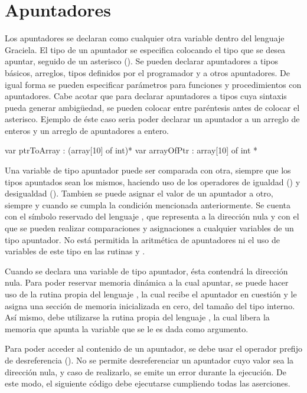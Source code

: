 \section{Apuntadores}

Los apuntadores se declaran como cualquier otra variable dentro del lenguaje
Graciela. El tipo de un apuntador se especifica colocando el tipo que se desea
apuntar, seguido de un asterisco (\ingra{*}). Se pueden declarar apuntadores
a tipos básicos, arreglos, tipos definidos por el programador y a otros
apuntadores. De igual forma se pueden especificar parámetros para funciones y
procedimientos con apuntadores. Cabe acotar que para declarar apuntadores a
tipos cuya sintaxis pueda generar ambigüedad, se pueden colocar entre paréntesis
antes de colocar el asterisco. Ejemplo de éste caso seria poder declarar un apuntador a
un arreglo de enteros y un arreglo de apuntadores a entero.

\begin{gracielacode}
var ptrToArray : (array[10] of int)*
var arrayOfPtr :  array[10] of int *
\end{gracielacode}

Una variable de tipo apuntador puede ser comparada con otra, siempre que los
tipos apuntados sean los mismos, haciendo uso de los operadores de igualdad
(\ingra{==}) y desigualdad (\ingra{!=}). Tambien se puede asignar el valor
de un apuntador a otro, siempre y cuando se cumpla la condición mencionada
anteriormente. Se cuenta con el símbolo reservado del lenguaje
, que representa a la dirección nula y con el que se pueden
realizar comparaciones y asignaciones a cualquier variables de un
tipo apuntador. No está permitida la aritmética de apuntadores ni el uso de
variables de este tipo en las rutinas  y .

Cuando se declara una variable de tipo apuntador, ésta contendrá la dirección
nula. Para poder reservar memoria dinámica a la cual apuntar, se puede hacer
uso de la rutina propia del lenguaje , la cual recibe el apuntador
en cuestión y le asigna una sección de memoria inicializada en cero, del
tamaño del tipo interno. Así mismo, debe utilizarse la rutina propia del
lenguaje , la cual libera la memoria que apunta la variable que
se le es dada como argumento.

Para poder acceder al contenido de un apuntador, se debe usar el operador
prefijo de desreferencia (\ingra{*}). No se permite desreferenciar un
apuntador cuyo valor sea la dirección nula, y caso de realizarlo, se emite un
error durante la ejecución. De este modo, el siguiente código debe ejecutarse
cumpliendo todas las aserciones.

